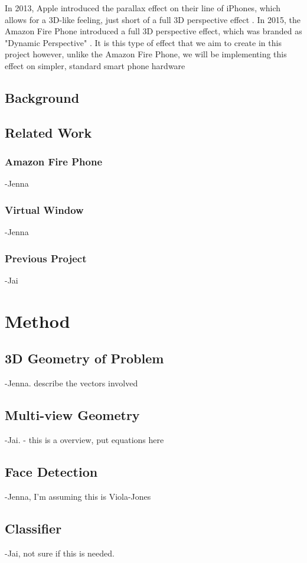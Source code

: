 \documentclass[12pt,twocolumn,letterpaper]{article}
\begin{document}
In 2013, Apple introduced the parallax effect on their line of iPhones, which allows for a 3D-like feeling, just short of a full 3D perspective effect \cite{BusinessInsider}.  In 2015, the Amazon Fire Phone introduced a full 3D perspective effect, which was branded as "Dynamic Perspective" \cite{DigitalTrends}.  It is this type of effect that we aim to create in this project however, unlike the Amazon Fire Phone, we will be implementing this effect on simpler, standard smart phone hardware
\subsection{Background}
    
\subsection{Related Work}
\subsubsection{Amazon Fire Phone}
     -Jenna
\subsubsection{Virtual Window}
     -Jenna
\subsubsection{Previous Project}
    -Jai
\section{Method}
\subsection{3D Geometry of Problem}
    -Jenna. describe the vectors involved
\subsection{Multi-view Geometry}
    -Jai. - this is a overview, put equations here
\subsection{Face Detection}
    -Jenna, I'm assuming this is Viola-Jones
\subsection{Classifier}
    -Jai, not sure if this is needed.
\end{document}
